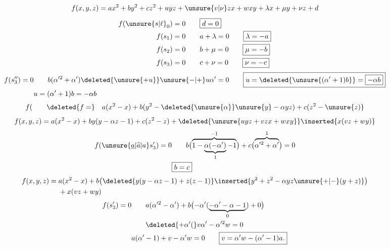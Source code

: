 \[
f(x,y,z)=ax^2+by^2+cz^2+uyz+\unsure{v|\nu}zx+wxy+\lambda x+\mu y+\nu z+d
\]
\[
\begin{aligned}
f(\unsure{s|\ell}_0)=0&\qquad\boxed{d=0}\\
f(s_1)=0&\qquad a+\lambda=0\qquad\boxed{\lambda=-a}\\
f(s_2)=0&\qquad b+\mu=0\qquad\boxed{\mu=-b}\\
f(s_3)=0&\qquad c+\nu=0\qquad\boxed{\nu=-c}
\end{aligned}
\]
\[
\begin{aligned}
f(s''_3)=0&\qquad b(\alpha^{\prime 2}+\alpha')\deleted{\unsure{+u}}\unsure{-|+}u\alpha'=0
\qquad\boxed{u=\deleted{\unsure{(\alpha'+1)b}}=\boxed{-\alpha b}}\\
&u=(\alpha'+1)b=-\alpha b
\end{aligned}
\]
\[
f(\qquad\deleted{f=}\quad
a(x^2-x)+b(y^2-\deleted{\unsure{\alpha}}\unsure{y}-\alpha yz)+c(z^2-\unsure{z)}
\]
\[
f(x,y,z)=a(x^2-x)+by(y-\alpha z-1)+c(z^2-z)
+\deleted{\unsure{uyz+vzx+wxy}}\inserted{x(vz+wy)}
\]
\[
\begin{aligned}
f(\unsure{\underline a|\widehat a|a}s'_3)=0&\qquad
b\bigl(\overbrace{1-\underbrace{\alpha(-\alpha')}_{1}-1}^{-1}\bigr)
+c\bigl(\overbrace{\alpha^{\prime 2}+\alpha'}^{1}\bigr)=0\\
&\boxed{b=c}
\end{aligned}
\]
\[
\begin{aligned}
f(x,y,z)={}&a(x^2-x)+b\bigl(\deleted{y(y-\alpha z-1)+z(z-1)}\inserted{y^2+z^2-\alpha yz\unsure{+|-}(y+z)}\bigr)\\
&+x(vz+wy)
\end{aligned}
\]
\[
\begin{aligned}
f(s'_3)=0&\qquad a(\alpha^{\prime 2}-\alpha')+b\bigl(-\alpha'(\underbrace{-\alpha'-\alpha-1}_{0})+0\bigr)\\
&\qquad\deleted{+\alpha'(}v\alpha'-\alpha^{\prime 2}w=0\\
&a(\alpha'-1)+v-\alpha'w=0\qquad\boxed{v=\alpha'w-(\alpha'-1)a.}
\end{aligned}
\]
